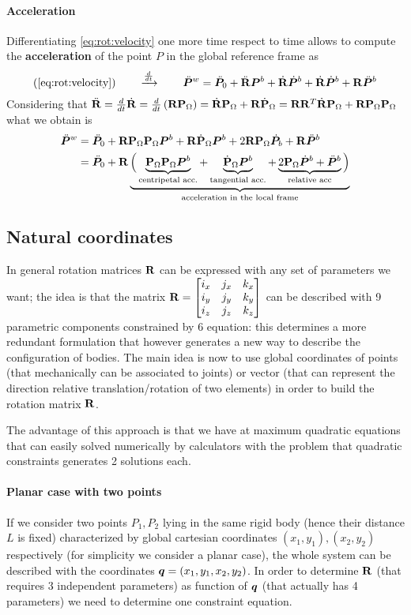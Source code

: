 		\paragraph{Acceleration} Differentiating \ref{eq:rot:velocity} one more time respect to time allows to compute the \textbf{acceleration} of the point $P$ in the global reference frame as
		\[ (\ref{eq:rot:velocity}) \qquad \xrightarrow{\frac d{dt}} \qquad \ddot{\boldsymbol{P}}^w = \ddot{\boldsymbol{P}}_0 + \ddot{\mathbf{R}} \boldsymbol{P}^b + \dot {\mathbf{R}} \dot{\boldsymbol{P}}^b + \dot {\mathbf{R}} \dot{\boldsymbol{P}}^b + \mathbf{R} \ddot{\boldsymbol{P}}^b \]
		Considering that $ \ddot {\mathbf{R}} = \frac d{dt} \dot {\mathbf{R}}= \frac d{dt} \left(\mathbf{R} \mathbf{P}_\Omega\right) = \dot {\mathbf{R}} \mathbf{P}_\Omega + \mathbf{R} \dot{\mathbf{P}}_\Omega = \mathbf{R} \mathbf{R}^T \dot {\mathbf{R}} \mathbf{P}_\Omega + \mathbf{R} \mathbf{P}_\Omega \mathbf{P}_\Omega$ what we obtain is
		\begin{equation}
			\begin{split}
				\ddot{\boldsymbol{P}}^w & = \ddot{\boldsymbol{P}}_0 + \mathbf{R} \mathbf{P}_\Omega\mathbf{P}_\Omega \boldsymbol{P}^b + \mathbf{R} \dot{\mathbf{P}}_\Omega \boldsymbol{P}^b + 2 \mathbf{R} \mathbf{P}_\Omega \dot{\boldsymbol{P}}_b + \mathbf{R} \ddot{\boldsymbol{P}}^b \\ 
				& = \ddot{\boldsymbol{P}}_0 + \mathbf{R} \underbrace{\Big( \underbrace{\mathbf{P}_\Omega \mathbf{P}_\Omega \boldsymbol{P}^b}_\textrm{centripetal acc.} + \underbrace{\dot{\mathbf{P}}_\Omega \boldsymbol{P}^b}_\textrm{tangential acc.} + \underbrace{2 \mathbf{P}_\Omega \dot{\boldsymbol{P}}^b + \ddot{\boldsymbol{P}}^b}_\textrm{relative acc} \Big)}_\textrm{acceleration in the local frame}
			\end{split}
		\end{equation}
	
	\subsection{Natural coordinates}
		In general rotation matrices $\mathbf{R}$ can be expressed with any set of parameters we want; the idea is that the matrix $\mathbf{R} = \begin{bmatrix} i_x & j_x & k_x \\ i_y & j_y & k_y \\ i_z & j_z & k_z  \end{bmatrix}$ can be described with 9 parametric components constrained by 6 equation: this determines a more redundant formulation that however generates a new way to describe the configuration of bodies. The main idea is now to use global coordinates of points (that mechanically can be associated to joints) or vector (that can represent the direction relative translation/rotation of two elements) in order to build the rotation matrix $\mathbf{R}$.
		
		The advantage of this approach is that we have at maximum quadratic equations that can easily solved numerically by calculators with the problem that quadratic constraints generates 2 solutions each.
		
		\paragraph{Planar case with two points} If we consider two points $P_1,P_2$ lying in the same rigid body (hence their distance $L$ is fixed) characterized by global cartesian coordinates $(x_1,y_1),(x_2,y_2)$ respectively (for simplicity we consider a planar case), the whole system can be described with the coordinates $\boldsymbol{q} = (x_1, y_1, x_2, y_2)$. In order to determine $\mathbf{R}$ (that requires 3 independent parameters) as function of $\boldsymbol{q}$ (that actually has 4 parameters) we need to determine one constraint equation.
		
